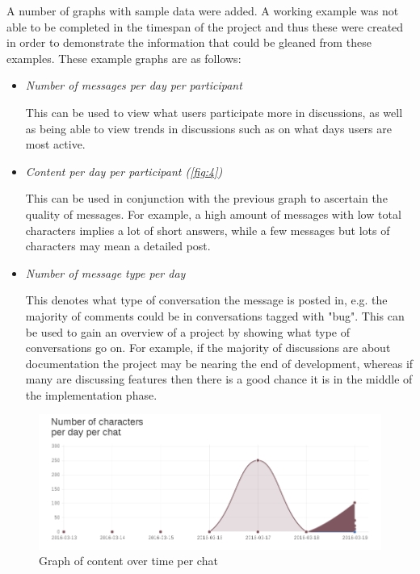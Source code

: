 \documentclass{l4proj}
\begin{document}
\newpage


A number of graphs with sample data were added.  A working example was not able to be completed in the timespan of the project and thus these were created in order to demonstrate the information that could be gleaned from these examples.  These example graphs are as follows:

\begin{itemize}
\item \textit{Number of messages per day per participant}
\par This can be used to view what users participate more in discussions, as well as being able to view trends in discussions such as on what days users are most active.
\item \textit{Content per day per participant (\ref{fig:4})}
\par This can be used in conjunction with the previous graph to ascertain the quality of messages.  For example, a high amount of messages with low total characters implies a lot of short answers, while a few messages but lots of characters may mean a detailed post.\item \textit{Number of message type per day}
\par This denotes what type of conversation the message is posted in, e.g. the majority of comments could be in conversations tagged with "bug".  This can be used to gain an overview of a project by showing what type of conversations go on.  For example, if the majority of discussions are about documentation the project may be nearing the end of development, whereas if many are discussing features then there is a good chance it is in the middle of the implementation phase.
\end{itemize}

\begin{figure}[h]
\includegraphics[scale=0.75]{WorkingGraph.png}
\centering
\caption{Graph of content over time per chat}
\label{fig:3}
\end{figure}
\end{document}
